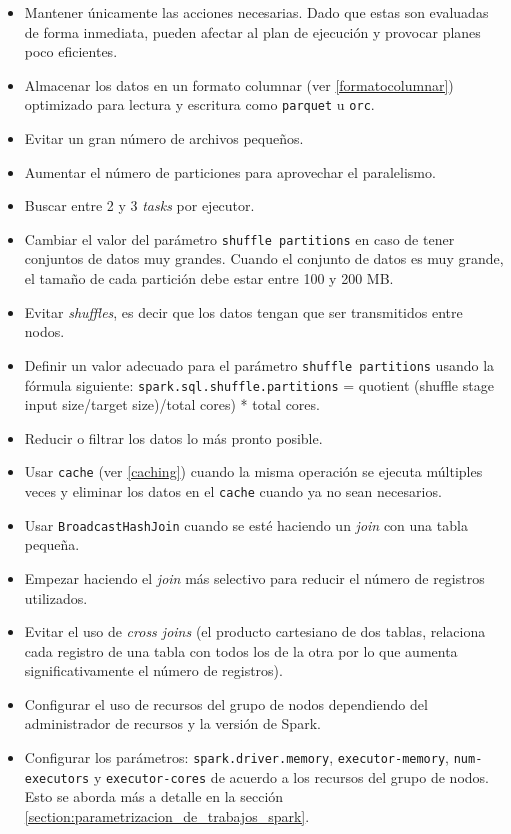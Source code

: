 \begin{itemize}
	\item Mantener únicamente las acciones necesarias. Dado que estas son evaluadas de forma inmediata, pueden afectar al plan de ejecución y provocar planes poco eficientes.
	\item Almacenar los datos en un formato columnar (ver \ref{formatocolumnar}) optimizado para lectura y escritura como \texttt{parquet} u \texttt{orc}.
	\item Evitar un gran número de archivos pequeños.
	\item Aumentar el número de particiones para aprovechar el paralelismo.
	\item Buscar entre 2 y 3 \textit{tasks} por ejecutor.
	\item Cambiar el valor del parámetro \texttt{shuffle partitions} en caso de tener conjuntos de datos muy grandes. Cuando el conjunto de datos es muy grande, el tamaño de cada partición debe estar entre 100 y 200 MB. 
	\item Evitar \textit{shuffles}, es decir que los datos tengan que ser transmitidos entre nodos.
	\item Definir un valor adecuado para el parámetro \texttt{shuffle partitions} usando la fórmula siguiente: \texttt{spark.sql.shuffle.partitions} = quotient (shuffle stage input size/target size)/total cores) * total cores.
	\item Reducir o filtrar los datos lo más pronto posible.
	\item Usar \texttt{cache} (ver \ref{caching}) cuando la misma operación se ejecuta múltiples veces y eliminar los datos en el \texttt{cache} cuando ya no sean necesarios.
	\item Usar \texttt{BroadcastHashJoin} cuando se esté haciendo un \textit{join} con una tabla pequeña.
	\item Empezar haciendo el \textit{join} más selectivo para reducir el número de registros utilizados.
	\item Evitar el uso de \textit{cross joins} (el producto cartesiano de dos tablas, relaciona cada registro de una tabla con todos los de la otra por lo que aumenta significativamente el número de registros).
	\item Configurar el uso de recursos del grupo de nodos dependiendo del administrador de recursos y la versión de Spark.
	\item Configurar los parámetros: \texttt{spark.driver.memory}, \texttt{executor-memory}, \texttt{num-executors} y \texttt{executor-cores} de acuerdo a los recursos del grupo de nodos. Esto se aborda más a detalle en la sección \ref{section:parametrizacion_de_trabajos_spark}.

\end{itemize}
